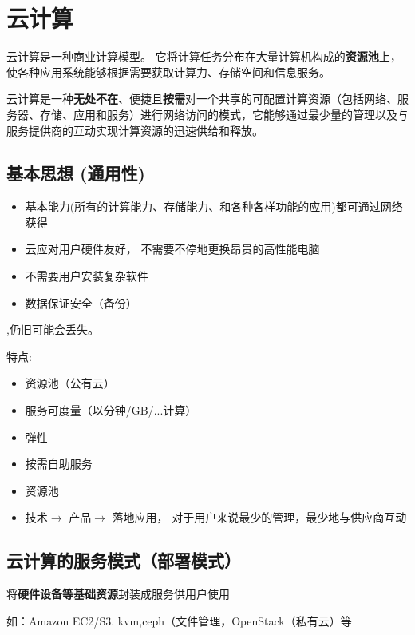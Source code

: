 \section{云计算}

\begin{definition}[云计算]
    云计算是一种商业计算模型。 它将计算任务分布在大量计算机构成的\textbf{资源池}上，使各种应用系统能够根据需要获取计算力、存储空间和信息服务。 

    云计算是一种\textbf{无处不在}、便捷且\textbf{按需}对一个共享的可配置计算资源（包括网络、服务器、存储、应用和服务）进行网络访问的模式，它能够通过最少量的管理以及与服务提供商的互动实现计算资源的迅速供给和释放。 
\end{definition}

\subsection{基本思想 (通用性)}

\begin{itemize}
    \item 基本能力(所有的计算能力、存储能力、和各种各样功能的应用)都可通过网络获得
    \item 云应对用户硬件友好， 不需要不停地更换昂贵的高性能电脑
    \item 不需要用户安装复杂软件
    \item 数据保证安全（备份）
\end{itemize}

,仍旧可能会丢失。

特点:
\begin{itemize}
    \item 资源池（公有云）
    \item 服务可度量（以分钟/GB/...计算）
    \item 弹性
    \item 按需自助服务
    \item 资源池
    \item 技术$\rightarrow$ 产品$\rightarrow$ 落地应用， 对于用户来说最少的管理，最少地与供应商互动
\end{itemize}

\subsection{云计算的服务模式（部署模式）}

\begin{definition}
    将\textbf{硬件设备等基础资源}封装成服务供用户使用

    如：Amazon EC2/S3. kvm,ceph（文件管理，OpenStack（私有云）等
\end{definition}

